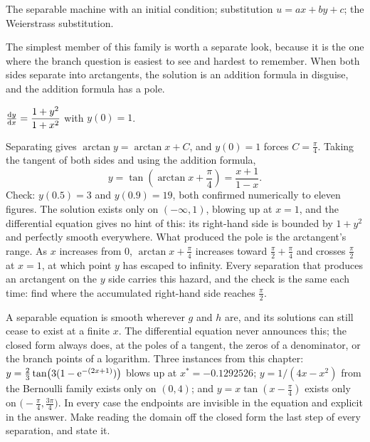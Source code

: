 \begin{seealsob}The separable machine with an initial condition; substitution $u=ax+by+c$; the Weierstrass substitution.\end{seealsob}

The simplest member of this family is worth a separate look, because it is the one where the branch question is easiest to see and hardest to remember. When both sides separate into arctangents, the solution is an addition formula in disguise, and the addition formula has a pole.

\begin{worked}
$\frac{\mathrm{d}y}{\mathrm{d}x}=\dfrac{1+y^{2}}{1+x^{2}}$ with $y(0)=1$.

Separating gives $\arctan y=\arctan x+C$, and $y(0)=1$ forces $C=\tfrac{\pi}{4}$. Taking the tangent of both sides and using the addition formula,
\[y=\tan\!\left(\arctan x+\frac{\pi}{4}\right)=\frac{x+1}{1-x}.\]
Check: $y(0.5)=3$ and $y(0.9)=19$, both confirmed numerically to eleven figures. The solution exists only on $(-\infty,1)$, blowing up at $x=1$, and the differential equation gives no hint of this: its right-hand side is bounded by $1+y^{2}$ and perfectly smooth everywhere. What produced the pole is the arctangent's range. As $x$ increases from $0$, $\arctan x+\tfrac{\pi}{4}$ increases toward $\tfrac{\pi}{2}+\tfrac{\pi}{4}$ and crosses $\tfrac{\pi}{2}$ at $x=1$, at which point $y$ has escaped to infinity. Every separation that produces an arctangent on the $y$ side carries this hazard, and the check is the same each time: find where the accumulated right-hand side reaches $\tfrac{\pi}{2}$.
\end{worked}

\begin{keynote}
A separable equation is smooth wherever $g$ and $h$ are, and its solutions can still cease to exist at a finite $x$. The differential equation never announces this; the closed form always does, at the poles of a tangent, the zeros of a denominator, or the branch points of a logarithm. Three instances from this chapter: $y=\tfrac23\tan\bigl(3(1-\mathrm{e}^{-(2x+1)})\bigr)$ blows up at $x^{*}=-0.1292526$; $y=1/(4x-x^{2})$ from the Bernoulli family exists only on $(0,4)$; and $y=x\tan(x-\tfrac{\pi}{4})$ exists only on $\bigl(-\tfrac{\pi}{4},\tfrac{3\pi}{4}\bigr)$. In every case the endpoints are invisible in the equation and explicit in the answer. Make reading the domain off the closed form the last step of every separation, and state it.
\end{keynote}

